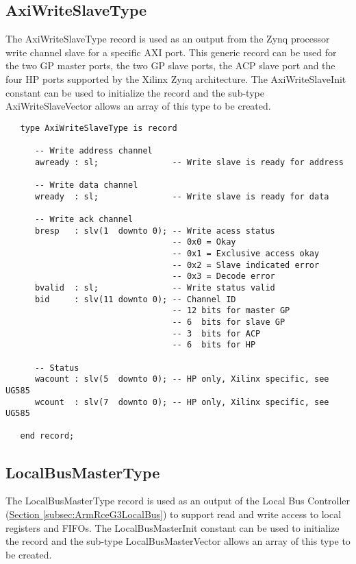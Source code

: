 \documentclass[11pt]{article}
\begin{document}
\normalsize

\subsection{AxiWriteSlaveType}
\label{subsec:AxiWriteSlaveType}

The AxiWriteSlaveType record is used as an output from the Zynq processor write channel slave for a specific AXI port. This generic record can be used for the two GP master ports, the two GP slave ports, the ACP slave port and the four HP ports supported by the Xilinx Zynq architecture. 
The AxiWriteSlaveInit constant can be used to initialize the record and the sub-type AxiWriteSlaveVector allows an array of this type to be created.

\small
\begin{verbatim}
   type AxiWriteSlaveType is record

      -- Write address channel
      awready : sl;               -- Write slave is ready for address

      -- Write data channel
      wready  : sl;               -- Write slave is ready for data

      -- Write ack channel
      bresp   : slv(1  downto 0); -- Write acess status
                                  -- 0x0 = Okay
                                  -- 0x1 = Exclusive access okay
                                  -- 0x2 = Slave indicated error 
                                  -- 0x3 = Decode error
      bvalid  : sl;               -- Write status valid
      bid     : slv(11 downto 0); -- Channel ID
                                  -- 12 bits for master GP
                                  -- 6  bits for slave GP
                                  -- 3  bits for ACP
                                  -- 6  bits for HP

      -- Status
      wacount : slv(5  downto 0); -- HP only, Xilinx specific, see UG585
      wcount  : slv(7  downto 0); -- HP only, Xilinx specific, see UG585

   end record;

\end{verbatim}
\normalsize

\subsection{LocalBusMasterType}
\label{subsec:LocalBusMasterType}

The LocalBusMasterType record is used as an output of the Local Bus Controller (\hyperref[subsec:ArmRceG3LocalBus]{Section \ref*{subsec:ArmRceG3LocalBus}}) to support read and write access to local registers and FIFOs.
The LocalBusMasterInit constant can be used to initialize the record and the sub-type LocalBusMasterVector allows an array of this type to be created.
\end{document}
